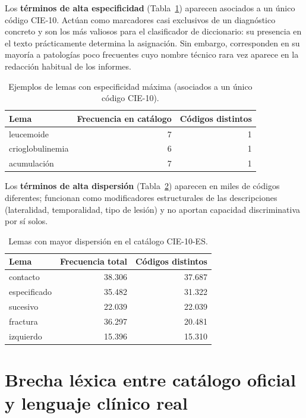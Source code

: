 Los \textbf{términos de alta especificidad} (Tabla~\ref{tab:high-spec}) aparecen asociados a un único código CIE-10. Actúan como marcadores casi exclusivos de un diagnóstico concreto y son los más valiosos para el clasificador de diccionario: su presencia en el texto prácticamente determina la asignación. Sin embargo, corresponden en su mayoría a patologías poco frecuentes cuyo nombre técnico rara vez aparece en la redacción habitual de los informes.

\begin{table}[h]
\centering
\caption{Ejemplos de lemas con especificidad máxima (asociados a un único código CIE-10).}
\label{tab:high-spec}
\begin{tabular}{lrr}
\hline
\textbf{Lema} & \textbf{Frecuencia en catálogo} & \textbf{Códigos distintos} \\
\hline
leucemoide & 7 & 1 \\
crioglobulinemia & 6 & 1 \\
acumulación & 7 & 1 \\
\hline
\end{tabular}
\end{table}

Los \textbf{términos de alta dispersión} (Tabla~\ref{tab:high-disp}) aparecen en miles de códigos diferentes; funcionan como modificadores estructurales de las descripciones (lateralidad, temporalidad, tipo de lesión) y no aportan capacidad discriminativa por sí solos.

\begin{table}[h]
\centering
\caption{Lemas con mayor dispersión en el catálogo CIE-10-ES.}
\label{tab:high-disp}
\begin{tabular}{lrr}
\hline
\textbf{Lema} & \textbf{Frecuencia total} & \textbf{Códigos distintos} \\
\hline
contacto & 38.306 & 37.687 \\
especificado & 35.482 & 31.322 \\
sucesivo & 22.039 & 22.039 \\
fractura & 36.297 & 20.481 \\
izquierdo & 15.396 & 15.310 \\
\hline
\end{tabular}
\end{table}

\section{Brecha léxica entre catálogo oficial y lenguaje clínico real}
\label{sec:brecha-lexica}

